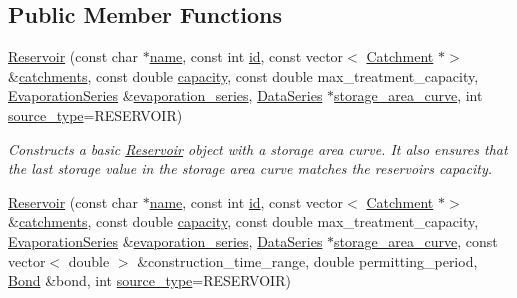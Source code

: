 \subsection*{Public Member Functions}
\begin{DoxyCompactItemize}
\item 
\mbox{\hyperlink{classReservoir_ac9803ae5446e4e9a2631ce66817004cf}{Reservoir}} (const char $\ast$\mbox{\hyperlink{classWaterSource_a846ea74c5b453d014f594d41fee8c765}{name}}, const int \mbox{\hyperlink{classWaterSource_a6eafe5dfefd317877d1244e8a7c6e742}{id}}, const vector$<$ \mbox{\hyperlink{classCatchment}{Catchment}} $\ast$$>$ \&\mbox{\hyperlink{classWaterSource_a8c18c34f23f8a06685c1d12f462ed830}{catchments}}, const double \mbox{\hyperlink{classWaterSource_a2ec257b415b248214a8bce7fc5267723}{capacity}}, const double max\+\_\+treatment\+\_\+capacity, \mbox{\hyperlink{classEvaporationSeries}{Evaporation\+Series}} \&\mbox{\hyperlink{classReservoir_a2d2d9b302c13703309bb798d24136810}{evaporation\+\_\+series}}, \mbox{\hyperlink{classDataSeries}{Data\+Series}} $\ast$\mbox{\hyperlink{classReservoir_a46bd5b750963dfa9a57b247fd77ab8ff}{storage\+\_\+area\+\_\+curve}}, int \mbox{\hyperlink{classWaterSource_afdd12c29fc74ea21dff1f1be9b8c2b7b}{source\+\_\+type}}=R\+E\+S\+E\+R\+V\+O\+IR)
\begin{DoxyCompactList}\small\item\em Constructs a basic \mbox{\hyperlink{classReservoir}{Reservoir}} object with a storage area curve. It also ensures that the last storage value in the storage area curve matches the reservoir\textquotesingle{}s capacity. \end{DoxyCompactList}\item 
\mbox{\hyperlink{classReservoir_a2e324b75aacc65d90b214ff7f62dfa89}{Reservoir}} (const char $\ast$\mbox{\hyperlink{classWaterSource_a846ea74c5b453d014f594d41fee8c765}{name}}, const int \mbox{\hyperlink{classWaterSource_a6eafe5dfefd317877d1244e8a7c6e742}{id}}, const vector$<$ \mbox{\hyperlink{classCatchment}{Catchment}} $\ast$$>$ \&\mbox{\hyperlink{classWaterSource_a8c18c34f23f8a06685c1d12f462ed830}{catchments}}, const double \mbox{\hyperlink{classWaterSource_a2ec257b415b248214a8bce7fc5267723}{capacity}}, const double max\+\_\+treatment\+\_\+capacity, \mbox{\hyperlink{classEvaporationSeries}{Evaporation\+Series}} \&\mbox{\hyperlink{classReservoir_a2d2d9b302c13703309bb798d24136810}{evaporation\+\_\+series}}, \mbox{\hyperlink{classDataSeries}{Data\+Series}} $\ast$\mbox{\hyperlink{classReservoir_a46bd5b750963dfa9a57b247fd77ab8ff}{storage\+\_\+area\+\_\+curve}}, const vector$<$ double $>$ \&construction\+\_\+time\+\_\+range, double permitting\+\_\+period, \mbox{\hyperlink{classBond}{Bond}} \&bond, int \mbox{\hyperlink{classWaterSource_afdd12c29fc74ea21dff1f1be9b8c2b7b}{source\+\_\+type}}=R\+E\+S\+E\+R\+V\+O\+IR)

\end{DoxyCompactItemize}
